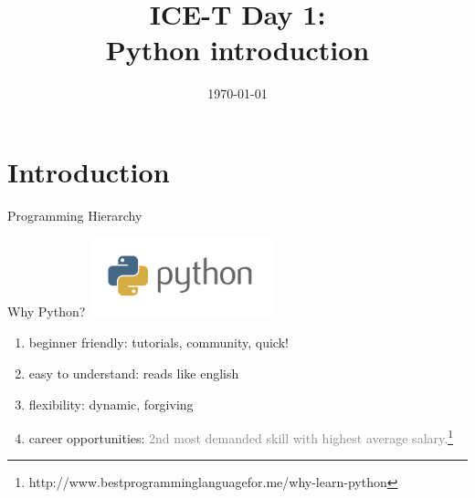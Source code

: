 \documentclass[xcolor=x11names,compress]{beamer}
\title[{\makebox[.5\paperwidth]{General Chemistry Recitation 1\hfill
       \insertframenumber/\inserttotalframenumber}}]{ICE-T Day 1:\\
Python introduction}
\author[\quad Amanda \quad\quad\quad\quad aed63@pitt.edu]{
}
\date{\small{\today}}
\renewcommand{\(}{\begin{columns}}
\renewcommand{\)}{\end{columns}}
\newcommand{\<}[1]{\begin{column}{#1}}
\renewcommand{\>}{\end{column}}
\begin{document}
\section{Introduction}
\begin{frame}
\titlepage
\end{frame}
\begin{frame}{Programming Hierarchy}
    \begin{center}
\end{center}
\end{frame}
    \begin{frame}{Why Python?}
\includegraphics[width= 0.4\textwidth]{python-logo-master-flat}
\begin{enumerate}[label=$\bullet$]
\item<1-> \textcolor{darkcoral}{beginner friendly: } \textcolor<2->{gray!30}{tutorials, community, quick!}
\item<2-> \textcolor{darkcoral}{easy to understand:} \textcolor<3->{gray!30}{reads like english}
\item<3-> \textcolor{darkcoral}{flexibility:} \textcolor<4->{gray!30}{dynamic, forgiving}
\item<4-> \textcolor{darkcoral}{career opportunities:} \textcolor<5->{gray}{2nd most demanded skill with highest average salary.\footnote{\tiny{http://www.bestprogramminglanguagefor.me/why-learn-python}}}
\end{enumerate}
\end{frame}
\end{document}
